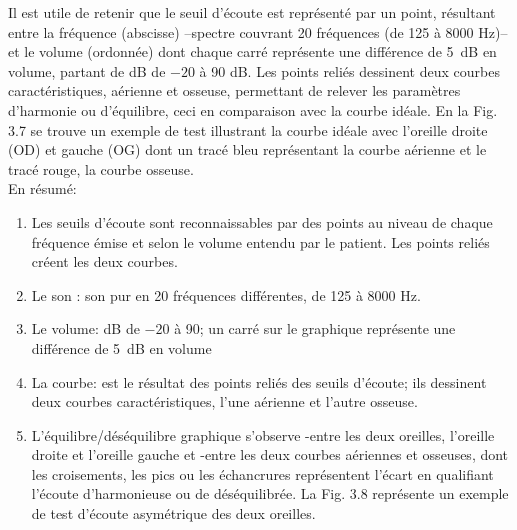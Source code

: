 

Il est utile de retenir
que le seuil d'écoute est représenté par un point, résultant entre la
fréquence (abscisse) --spectre couvrant 20
fréquences (de 125 à 8000 Hz)--   et le volume
(ordonnée) dont chaque carré représente une différence de \SI{5}{\dB} en
volume, partant de dB de $-20$ à 90 dB.
Les points reliés dessinent deux courbes caractéristiques, aérienne
et osseuse, permettant de relever les paramètres d'harmonie ou
          d'équilibre, ceci
 	en comparaison avec la courbe idéale. En la Fig. 3.7 se trouve un exemple de test illustrant la 
 	courbe idéale avec l'oreille 
 	droite (OD) et gauche (OG) dont un tracé bleu 
 	représentant 
 	la courbe aérienne et le tracé rouge, la courbe osseuse. 
 	 \\
 	En résumé: 
        \begin{enumerate}
 \item   Les seuils d'écoute sont reconnaissables par des points au niveau de
          chaque fréquence émise et selon le volume entendu par le
          patient. Les points reliés créent les deux courbes.
 	\item Le son : son pur en 20 fréquences différentes, de 125 à 8000 Hz.
 	\item Le volume: dB de $-20$ à 90; un carré sur le graphique représente une différence de \SI{5}{\dB} en
 		volume
 	\item La courbe: est le résultat des points reliés des seuils
          d'écoute; ils
          dessinent deux courbes caractéristiques, l'une aérienne et l'autre osseuse.
\item L'équilibre/déséquilibre graphique s'observe
        -entre les deux oreilles, l'oreille droite et l'oreille gauche
        et
        -entre les deux courbes aériennes et osseuses, dont les
        croisements, les pics ou les échancrures représentent
        l'écart en
        qualifiant l'écoute d'harmonieuse ou de
        déséquilibrée. La Fig. 3.8 représente un exemple de test
        d'écoute asymétrique des deux oreilles.
      \end{enumerate}

